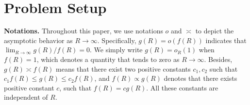 \documentclass{article}
\theoremstyle{plain}
\theoremstyle{definition}
\theoremstyle{remark}
\begin{document}

\section{Problem Setup}
\label{sec:problem_setup}

\textbf{Notations.}
Throughout this paper, we use notations $o$ and $\asymp$ to depict the asymptotic behavior as $R \to \infty$. Specifically, $g(R)=o(f(R))$ indicates that $\lim_{R \to \infty} g(R)/f(R) = 0$. We simply write $g(R)=o_R(1)$ when $f(R)=1$, which denotes a quantity that tends to zero as $R \to \infty$. Besides, $g(R) \asymp f(R)$ means that there exist two positive constants $c_1, c_2$ such that $c_1 f(R) \leq g(R) \leq c_2 f(R)$, and $f(R) \propto g(R)$ denotes that there exists positive constant $c$, such that $f(R) = cg(R)$. All these constants are independent of $R$.

\end{document}
